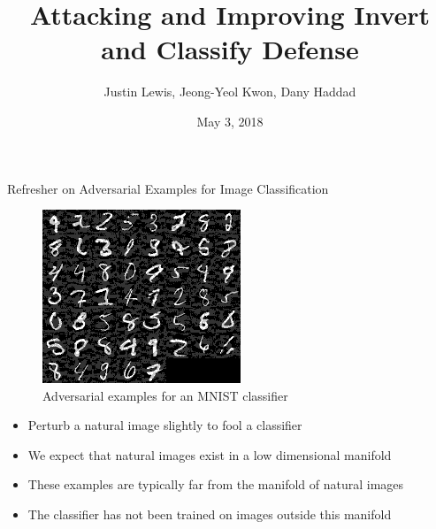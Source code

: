 \documentclass[10pt]{beamer}
\title{Attacking and Improving Invert and Classify Defense}
\date{May 3, 2018}
\author{Justin Lewis, Jeong-Yeol Kwon, Dany Haddad}
\begin{document}
\maketitle

\begin{frame}{Refresher on Adversarial Examples for Image Classification}
\begin{figure}[H]
    \caption{Adversarial examples for an MNIST classifier}
    \centering
    \includegraphics[scale=0.5]{./cl_adversarial.png}
\end{figure}
    \begin{itemize}
        \item Perturb a natural image slightly to fool a classifier
        \item We expect that natural images exist in a low dimensional manifold
        \item These examples are typically far from the manifold of natural images \cite{ilyas2017}
        \item The classifier has not been trained on images outside this manifold
    \end{itemize}
\end{frame}
\end{document}
